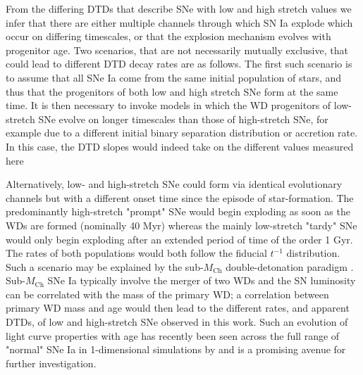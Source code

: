 \documentclass[fleqn,usenatbib]{mnras}
\begin{document}
From the differing DTDs that describe SNe with low and high stretch values we infer that there are either multiple channels through which SN Ia explode which occur on differing timescales, or that the explosion mechanism evolves with progenitor age. Two scenarios, that are not necessarily mutually exclusive, that could lead to different DTD decay rates are as follows. 
The first such scenario is to assume that all SNe Ia come from the same initial population of stars, and thus that the progenitors of both low and high stretch SNe form at the same time. It is then necessary to invoke models in which the WD progenitors of low-stretch SNe evolve on longer timescales than those of high-stretch SNe, for example due to a different initial binary separation distribution or accretion rate. In this case, the DTD slopes would indeed take on the different values measured here

Alternatively, low- and high-stretch SNe could form via identical evolutionary channels but with a different onset time since the episode of star-formation. The predominantly high-stretch "prompt" SNe would begin exploding as soon as the WDs are formed (nominally 40 Myr) whereas the mainly low-stretch "tardy" SNe would only begin exploding after an extended period of time of the order 1 Gyr. The rates of both populations would both follow the fiducial $t^{-1}$ distribution.
Such a scenario may be explained by the sub-$M_{\mathrm{Ch}}$ double-detonation paradigm \citep[e.g.][]{Sim2010,Blondin2017,Shen2017a}. Sub-$M_{\mathrm{Ch}}$ SNe Ia typically involve the merger of two WDs and the SN luminosity can be correlated with the mass of the primary WD; a correlation between primary WD mass and age would then lead to the different rates, and apparent DTDs, of low and high-stretch SNe observed in this work. Such an evolution of light curve properties with age has recently been seen across the full range of "normal" SNe Ia in 1-dimensional simulations by \citet{Shen2021} and is a promising avenue for further investigation.
\end{document}
